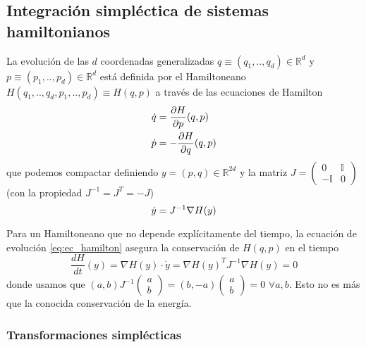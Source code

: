 \subsection{Integración simpléctica de sistemas hamiltonianos}

La evolución de las $d$ coordenadas generalizadas $q \equiv (q_1,..,q_d)\in\mathbb{R}^{d}$ y $p \equiv (p_1,..,p_d)\in\mathbb{R}^{d}$ está definida por el Hamiltoneano
$H(q_1,..,q_d,p_1,..,p_d) \equiv H(q,p)$  a través de las ecuaciones de Hamilton
\begin{align*}
 \dot{q} &= \frac{\partial H}{\partial p}(q,p) \\
 \dot{p} &= -\frac{\partial H}{\partial q}(q,p)
\end{align*}
que podemos compactar definiendo $y=(p,q)\in\mathbb{R}^{2d}$ y la matriz $J = \begin{pmatrix}0 & \mathbb{I} \\-\mathbb{I} & 0\end{pmatrix}$ (con la propiedad $J^{-1} = J^T = -J$)
\begin{equation}{\label{eq:ec_hamilton}}
 \dot{y} = J^{-1}\nabla H(y)
\end{equation}

Para un Hamiltoneano que no depende explícitamente del tiempo, la ecuación de evolución \ref{eq:ec_hamilton} asegura la conservación de $H(q,p)$ en el tiempo
\[ \frac{dH}{dt}(y) = \nabla H(y)\cdot \dot{y} = \nabla H(y)^T J^{-1}\nabla H(y) = 0\]
donde usamos que $(a,b)J^{-1}\begin{pmatrix}a\\b\end{pmatrix} = (b, -a)\begin{pmatrix}a\\b\end{pmatrix} = 0$ $\forall a,b$.
Esto no es más que la conocida conservación de la energía.

\subsubsection{Transformaciones simplécticas}{\label{sec:trans_simp}}

